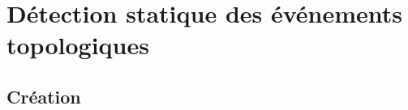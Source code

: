 \documentclass[presentation]{beamer}
\begin{document}


\section{Détection statique des événements topologiques}



\subsection{Création}

\end{document}
